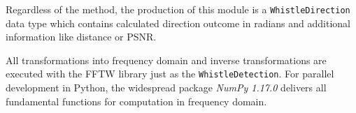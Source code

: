 Regardless of the method, the production of this module is a
\lstinline!WhistleDirection! data type which contains calculated
direction outcome in radians and additional information like distance or \ac{PSNR}.

All transformations into frequency domain and inverse transformations
are executed with the \ac{FFTW} library just as the \lstinline!WhistleDetection!.
For parallel development in Python, the widespread package \textit{NumPy 1.17.0} delivers
all fundamental functions for computation in frequency domain.






